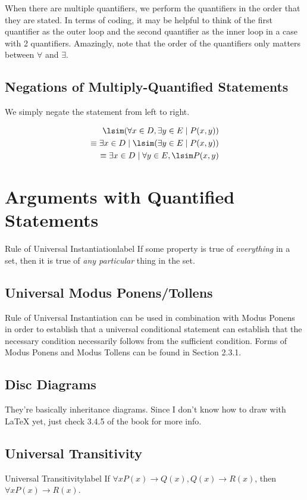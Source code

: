 \documentclass[a4paper]{report}
\begin{document}
When there are multiple quantifiers, we perform the quantifiers in the order that they are stated. In terms of coding, it may be helpful to think
of the first quantifier as the outer loop and the second quantifier as the inner loop in a case with 2 quantifiers.
Amazingly, note that the order of the quantifiers only matters between $\forall $ and $\exists $.

\subsection{Negations of Multiply-Quantified Statements}

We simply negate the statement from left to right.

\begin{align}
    \lsim (\forall x \in D, \exists y \in E  \mid P(x, y)) \\
    \equiv \exists x \in D  \mid \lsim (\exists y \in E  \mid P(x, y)) \\
    \equiv \exists x \in D  \mid \forall y \in E, \lsim P(x, y)
\end{align}

\section{Arguments with Quantified Statements}

\begin{definition}{Rule of Universal Instantiation}{label}
    If some property is true of \emph{everything} in a set, then it is true of \emph{any particular} thing in the set.
\end{definition}

\subsection{Universal Modus Ponens/Tollens}

Rule of Universal Instantiation can be used in combination with Modus Ponens in order to establish that a universal conditional statement can establish
that the necessary condition necessarily follows from the sufficient condition.
Forms of Modus Ponens and Modus Tollens can be found in Section 2.3.1.

\subsection{Disc Diagrams}

They're basically inheritance diagrams. Since I don't know how to draw with LaTeX yet, just check 3.4.5 of the book for more info.

\subsection{Universal Transitivity}

\begin{definition}{Universal Transitivity}{label}
    If $\forall x P(x) \to Q(x), Q(x) \to R(x)$, then $\forall x P(x) \to R(x)$.
\end{definition}
\end{document}
